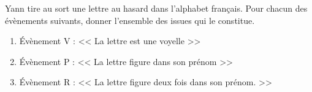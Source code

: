 Yann tire au sort une lettre au hasard dans l'alphabet français. Pour chacun des évènements suivants, donner l'ensemble des issues qui le constitue.
\begin{enumerate}
    \item Évènement V : << La lettre est une voyelle >>
    \item Évènement P : << La lettre figure dans son prénom >>
    \item Évènement R : << La lettre figure deux fois dans son prénom. >>
\end{enumerate}